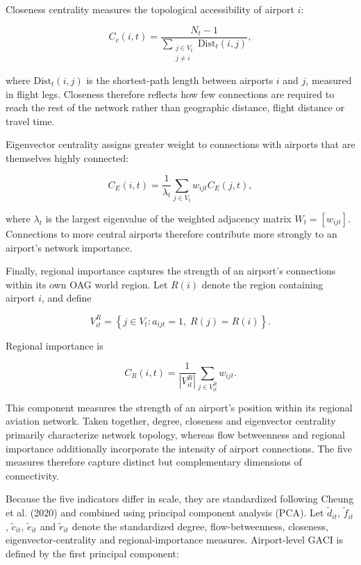 \documentclass[12pt]{extarticle}
\begin{document}
Closeness centrality measures the topological accessibility of airport $i$:

\begin{equation}
C_c(i,t)
=
\frac{N_t-1}
{\displaystyle
\sum_{\substack{j\in V_t\\j\neq i}}
\mathrm{Dist}_t(i,j)
},
\label{eq:nature_13}
\end{equation}

where $\mathrm{Dist}_t(i,j)$ is the shortest-path length between airports $i$ and $j$, measured in flight legs. Closeness therefore reflects how few connections are required to reach the rest of the network rather than geographic distance, flight distance or travel time.

Eigenvector centrality assigns greater weight to connections with airports that are themselves highly connected:

\begin{equation}
C_E(i,t)
=
\frac{1}{\lambda_t}
\sum_{j\in V_t}
w_{ijt} C_E(j,t),
\label{eq:nature_14}
\end{equation}

where $\lambda_t$ is the largest eigenvalue of the weighted adjacency matrix $W_t=[w_{ijt}]$. Connections to more central airports therefore contribute more strongly to an airport's network importance.

Finally, regional importance captures the strength of an airport's connections within its own OAG world region. Let $R(i)$ denote the region containing airport $i$, and define

\begin{equation}
V^R_{it}
=
\left\{
j\in V_t:
a_{ijt}=1,\;
R(j)=R(i)
\right\}.
\label{eq:nature_15}
\end{equation}

Regional importance is

\begin{equation}
C_R(i,t)
=
\frac{1}{|V^R_{it}|}
\sum_{j\in V^R_{it}}
w_{ijt}.
\label{eq:nature_16}
\end{equation}

This component measures the strength of an airport's position within its regional aviation network. Taken together, degree, closeness and eigenvector centrality primarily characterize network topology, whereas flow betweenness and regional importance additionally incorporate the intensity of airport connections. The five measures therefore capture distinct but complementary dimensions of connectivity.

Because the five indicators differ in scale, they are standardized following Cheung et al. (2020) and combined using principal component analysis (PCA). Let $\tilde d_{it}$, $\tilde f_{it}$, $\tilde c_{it}$, $\tilde e_{it}$ and $\tilde r_{it}$ denote the standardized degree, flow-betweenness, closeness, eigenvector-centrality and regional-importance measures. Airport-level GACI is defined by the first principal component:
\end{document}
